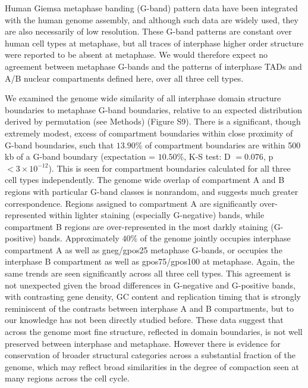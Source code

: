 \documentclass[a4paper,10pt,oneside]{book}
\begin{document}
Human Giemsa metaphase banding (G-band) pattern data have been integrated with the human genome assembly, and although such data are widely used, they are also necessarily of low resolution.\cite{Furey2003} These G-band patterns are constant over human cell types at metaphase, but all traces of interphase higher order structure were reported to be absent at metaphase.\cite{Naumova2013} We would therefore expect no agreement between metaphase G-bands and the patterns of interphase TADs and A/B nuclear compartments defined here, over all three cell types. 

We examined the genome wide similarity of all interphase domain structure boundaries to metaphase G-band boundaries, relative to an expected distribution derived by permutation (see Methods) (Figure S9). There is a significant, though extremely modest, excess of compartment boundaries within close proximity of G-band boundaries, such that $13.90\%$ of compartment boundaries are within 500 kb of a G-band boundary (expectation = $10.50\%$, K-S test: D $= 0.076$, p $< 3 \times10^{-12}$). This is seen for compartment boundaries calculated for all three cell types independently. The genome wide overlap of compartment A and B regions with particular G-band classes is nonrandom, and suggests much greater correspondence. Regions assigned to compartment A are significantly over-represented within lighter staining (especially G-negative) bands, while compartment B regions are over-represented in the most darkly staining (G-positive) bands. Approximately $40\%$ of the genome jointly occupies interphase compartment A as well as gneg/gpos25 metaphase G-bands, or occupies the interphase B compartment as well as gpos75/gpos100 at metaphase. Again, the same trends are seen significantly across all three cell types. This agreement is not unexpected given the broad differences in G-negative and G-positive bands, with contrasting gene density, GC content and replication timing\cite{Furey2003} that is strongly reminiscent of the contrasts between interphase A and B compartments,\cite{Lieberman2009} but to our knowledge has not been directly studied before. These data suggest that across the genome most fine structure, reflected in domain boundaries, is not well preserved between interphase and metaphase. However there is evidence for conservation of broader structural categories across a substantial fraction of the genome, which may reflect broad similarities in the degree of compaction seen at many regions across the cell cycle.
\end{document}
